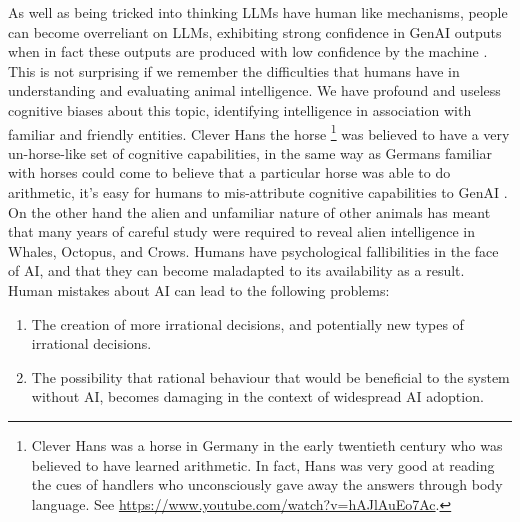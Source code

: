 \documentclass[11pt]{article}
\begin{document}
As well as being tricked into thinking LLMs have human like mechanisms, people can become overreliant on LLMs, exhibiting strong confidence in GenAI outputs when in fact these outputs are produced with low confidence by the machine \cite{zhouRELAIInteractionCenteredApproach2025}. 
This is not surprising if we remember the difficulties that humans have in understanding and evaluating animal intelligence. We have profound and useless cognitive biases about this topic, identifying intelligence in association with familiar and friendly entities. Clever Hans the horse \footnote{Clever Hans was a horse in Germany in the early twentieth century who was believed to have learned arithmetic. In fact, Hans was very good at reading the cues of handlers who unconsciously gave away the answers through body language. See \url{https://www.youtube.com/watch?v=hAJlAuEo7Ac}.} was believed to have a very un-horse-like set of cognitive capabilities, in the same way as Germans familiar with horses could come to believe that a particular horse was able to do arithmetic, it's easy for humans to mis-attribute cognitive capabilities to GenAI \cite{voudourisBringingComparativeCognition2025}. On the other hand the alien and unfamiliar nature of other animals has meant that many years of careful study were required to reveal alien intelligence in Whales, Octopus, and Crows. 
Humans have psychological fallibilities in the face of AI, and that they can become maladapted to its availability as a result. Human mistakes about AI can lead to the following problems: 
\begin{enumerate}
\item The creation of more irrational decisions, and potentially new types of irrational decisions.
\item The possibility that rational behaviour that would be beneficial to the system without AI,  becomes damaging in the context of widespread AI adoption.
\end{enumerate}
\end{document}
